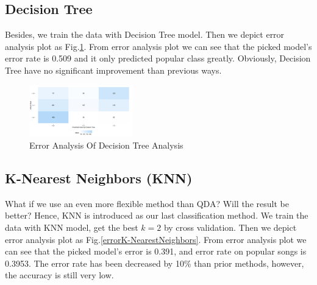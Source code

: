 \documentclass[conference]{IEEEtran}
\begin{document}
\subsection{Decision Tree}
Besides, we train the data with Decision Tree model. Then we depict error analysis plot as Fig.\ref{errorDicisionTree.pdf}. From error analysis plot we can see that the picked model's error rate is 0.509 and it only predicted popular class greatly. Obviously, Decision Tree have no significant improvement than previous ways. 


\begin{figure}[htbp]
\centerline{\includegraphics[width=0.4\textwidth]{figure/errorDicisionTree.png}}
\caption{Error Analysis Of Decision Tree Analysis}
\label{errorDicisionTree.pdf}
\end{figure}





\subsection{K-Nearest Neighbors (KNN)}
What if we use an even more flexible method than QDA? Will the result be better? Hence, KNN is introduced as our last classification method. We train the data with KNN model, get the best $k=2$ by cross validation. Then we depict error analysis plot as Fig.\ref{errorK-NearestNeighbors}. From error analysis plot we can see that the picked model's error is 0.391, and error rate on popular songs is 0.3953. The error rate has been decreased by 10\% than prior methods, however, the accuracy is still very low.
\end{document}
